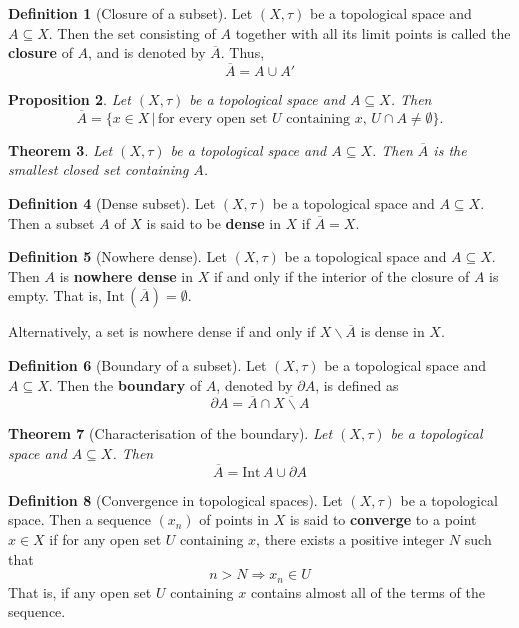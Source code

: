 \documentclass[10pt, oneside, reqno]{amsart}
\theoremstyle{plain}%
\newtheorem{thm}{Theorem}[section]
\newtheorem{prop}[thm]{Proposition}
\theoremstyle{definition}
\newtheorem{defn}[thm]{Definition}
\theoremstyle{remark}
\newcommand{\topo}{(X,\tau)}
\newcommand{\intr}{\text{Int}\,}
\newcommand{\ol}[1]{\overline{#1}}
\begin{document}
\begin{defn}[Closure of a subset]
	Let $\topo$ be a topological space and $A \subseteq X$.  Then the set consisting of $A$ together with all its limit points is called the \textbf{closure} of $A$, and is denoted by $\ol A$.  Thus,\[
		\ol A = A \cup A'
 	\]
\end{defn}

\begin{prop}
	Let $\topo$ be a topological space and $A \subseteq X$.  Then \[
		\ol A = \{ x \in X \, | \, \text{for every open set $U$ containing $x$, $U \cap A \neq \emptyset$} \}.
	\]
\end{prop}

\begin{thm}
		Let $\topo$ be a topological space and $A \subseteq X$.  Then $\ol A$ is the smallest closed set containing $A$.
\end{thm}

\begin{defn}[Dense subset]
		Let $\topo$ be a topological space and $A \subseteq X$.  Then a subset $A$ of $X$ is said to be \textbf{dense} in $X$ if $\ol A = X$.
\end{defn}

\begin{defn}[Nowhere dense]
		Let $\topo$ be a topological space and $A \subseteq X$. Then $A$ is \textbf{nowhere dense} in $X$ if and only if the interior of the closure of $A$ is empty.  That is, $\intr (\ol A) = \emptyset$.  
		
		Alternatively, a set is nowhere dense if and only if $X \backslash \ol A$ is dense in $X$.
\end{defn}

\begin{defn}[Boundary of a subset]
	Let $\topo$ be a topological space and $A \subseteq X$.  Then the \textbf{boundary} of $A$, denoted by $\partial A$, is defined as \[
		\partial A = \ol A \cap \ol{X \backslash A}
	\]
\end{defn}

\begin{thm}[Characterisation of the boundary]
		Let $\topo$ be a topological space and $A \subseteq X$. Then \[
			\ol A = \intr A \cup \partial A
		\]
\end{thm}

\begin{defn}[Convergence in topological spaces]
	Let $\topo$ be a topological space.  Then a sequence $(x_n)$ of points in $X$ is said to \textbf{converge} to a point $x \in X$ if for any open set $U$ containing $x$, there exists a positive integer $N$ such that \[
		n > N \Rightarrow x_n \in U
	\]
	That is, if any open set $U$ containing $x$ contains almost all of the terms of the sequence.
\end{defn}
\end{document}
